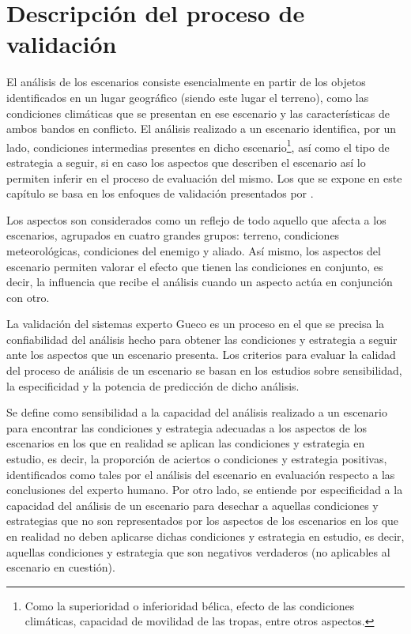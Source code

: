 \section{Descripción del proceso de validación}

El análisis de los escenarios consiste esencialmente en partir de los objetos identificados en un lugar geográfico (siendo este lugar el terreno), como las condiciones climáticas que se presentan en ese escenario y las características de ambos bandos en conflicto. El análisis realizado a un escenario identifica, por un lado, condiciones intermedias presentes en dicho escenario\footnote{Como la superioridad o inferioridad bélica, efecto de las condiciones climáticas, capacidad de movilidad de las tropas, entre otros aspectos.}, así como el tipo de estrategia a seguir, si en caso los aspectos que describen el escenario así lo permiten inferir en el proceso de evaluación del mismo. Los que se expone en este capítulo se basa en los enfoques de validación presentados por \citealt{Oleary88}.

Los aspectos son considerados como un reflejo de todo aquello que afecta a los escenarios, agrupados en cuatro grandes grupos: terreno, condiciones meteorológicas, condiciones del enemigo y aliado. Así mismo, los aspectos del escenario permiten valorar el efecto que tienen las condiciones en conjunto, es decir, la influencia que recibe el análisis cuando un aspecto actúa en conjunción con otro.

La validación del sistemas experto Gueco es un proceso en el que se precisa la confiabilidad del análisis hecho para obtener las condiciones y estrategia a seguir ante los aspectos que un escenario presenta. Los criterios para evaluar la calidad del proceso de análisis de un escenario se basan en los estudios sobre sensibilidad, la especificidad y la potencia de predicción de dicho análisis.

Se define como sensibilidad a la capacidad del análisis realizado a un escenario para encontrar las condiciones y estrategia adecuadas a los aspectos de los escenarios en los que en realidad se aplican las condiciones y estrategia en estudio, es decir, la proporción de aciertos o condiciones y estrategia positivas, identificados como tales por el análisis del escenario en evaluación respecto a las conclusiones del experto humano. Por otro lado, se entiende por especificidad a la capacidad del análisis de un escenario para desechar a aquellas condiciones y estrategias que no son representados por los aspectos de los escenarios en los que en realidad no deben aplicarse dichas condiciones y estrategia en estudio, es decir, aquellas condiciones y estrategia que son negativos verdaderos (no aplicables al escenario en cuestión).

